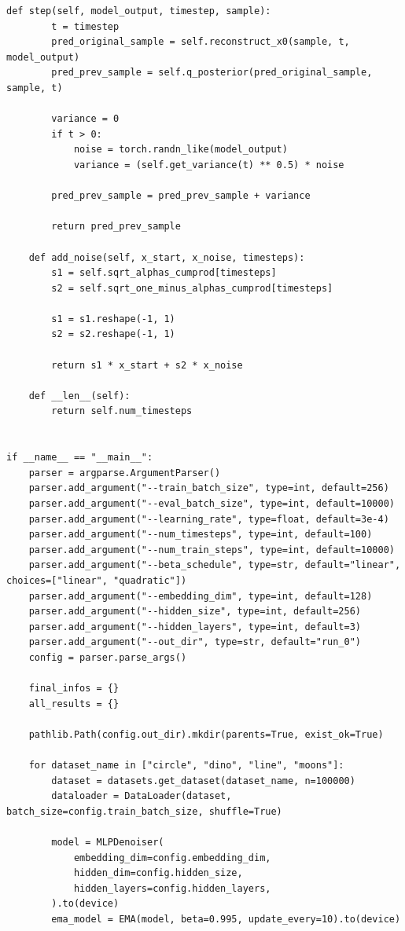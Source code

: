 \begin{appendices}
\begin{tcolorbox}[breakable,colback=orange!5!white, colframe=orange!80!black, title=Generalized Idea Generation System and User Prompt]
\begin{Verbatim}[breaklines, breaksymbol={}, breaksymbolleft={}, fontsize=\small]
    def step(self, model_output, timestep, sample):
        t = timestep
        pred_original_sample = self.reconstruct_x0(sample, t, model_output)
        pred_prev_sample = self.q_posterior(pred_original_sample, sample, t)

        variance = 0
        if t > 0:
            noise = torch.randn_like(model_output)
            variance = (self.get_variance(t) ** 0.5) * noise

        pred_prev_sample = pred_prev_sample + variance

        return pred_prev_sample

    def add_noise(self, x_start, x_noise, timesteps):
        s1 = self.sqrt_alphas_cumprod[timesteps]
        s2 = self.sqrt_one_minus_alphas_cumprod[timesteps]

        s1 = s1.reshape(-1, 1)
        s2 = s2.reshape(-1, 1)

        return s1 * x_start + s2 * x_noise

    def __len__(self):
        return self.num_timesteps


if __name__ == "__main__":
    parser = argparse.ArgumentParser()
    parser.add_argument("--train_batch_size", type=int, default=256)
    parser.add_argument("--eval_batch_size", type=int, default=10000)
    parser.add_argument("--learning_rate", type=float, default=3e-4)
    parser.add_argument("--num_timesteps", type=int, default=100)
    parser.add_argument("--num_train_steps", type=int, default=10000)
    parser.add_argument("--beta_schedule", type=str, default="linear", choices=["linear", "quadratic"])
    parser.add_argument("--embedding_dim", type=int, default=128)
    parser.add_argument("--hidden_size", type=int, default=256)
    parser.add_argument("--hidden_layers", type=int, default=3)
    parser.add_argument("--out_dir", type=str, default="run_0")
    config = parser.parse_args()

    final_infos = {}
    all_results = {}

    pathlib.Path(config.out_dir).mkdir(parents=True, exist_ok=True)

    for dataset_name in ["circle", "dino", "line", "moons"]:
        dataset = datasets.get_dataset(dataset_name, n=100000)
        dataloader = DataLoader(dataset, batch_size=config.train_batch_size, shuffle=True)

        model = MLPDenoiser(
            embedding_dim=config.embedding_dim,
            hidden_dim=config.hidden_size,
            hidden_layers=config.hidden_layers,
        ).to(device)
        ema_model = EMA(model, beta=0.995, update_every=10).to(device)


\end{Verbatim}
\end{tcolorbox}
\end{appendices}
